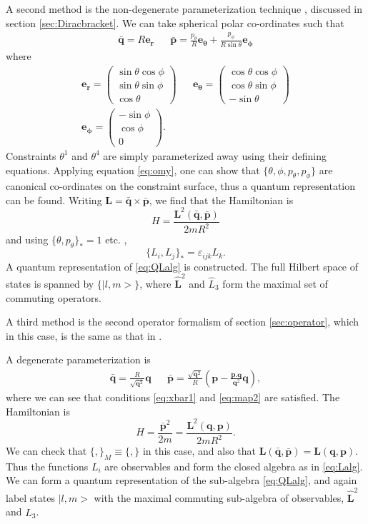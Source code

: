\documentclass[a4paper,12pt]{article}
\theoremstyle{definition}
\theoremstyle{remark}
\numberwithin{equation}{section}
\newcommand{\eps}{\varepsilon}
\newcommand{\Lh}{\hat{L}}
\newcommand{\erb}{\mathbf{e_r}}
\newcommand{\etb}{\mathbf{e_{\theta}}}
\newcommand{\epb}{\mathbf{e_{\phi}}}
\newcommand{\qb}{\mathbf{q}}
\newcommand{\pb}{\mathbf{p}}
\newcommand{\Lb}{\mathbf{L}}
\newcommand{\Lhb}{\mathbf{\hat{L}}}
\begin{document}
{A second method is the non-degenerate parameterization technique
, discussed in section \ref{sec:Diracbracket}.
We can take spherical polar co-ordinates such that
\begin{eqnarray}
\bar{\qb}=R\erb && \bar{\pb}=\frac{p_{\theta}}{R}\etb +
\frac{p_{\phi}}{R\sin{\theta}}\epb
\end{eqnarray}
where
\begin{eqnarray}
\erb=
\begin{pmatrix}
\sin{\theta}\cos{\phi}\\
\sin{\theta}\sin{\phi}\\
\cos{\theta}
\end{pmatrix}&&
\etb=
\begin{pmatrix}
\cos{\theta}\cos{\phi}\\
\cos{\theta}\sin{\phi}\\
-\sin{\theta}
\end{pmatrix}\\
\epb=
\begin{pmatrix}
-\sin{\phi}\\
\cos{\phi}\\
0
\end{pmatrix}.
\end{eqnarray}
Constraints $\theta^1$ and $\theta^4$ are simply parameterized away
using their defining equations. Applying equation \eqref{eq:omy},
one can show that $\{\theta,\phi,p_{\theta},p_{\phi}\}$ are
canonical co-ordinates on the constraint surface, thus a quantum
representation can be found. Writing
$\Lb=\bar{\qb}\times\bar{\pb}$, we find that the Hamiltonian is
\begin{equation}
H=\frac{\Lb^2(\bar{\qb},\bar{\pb})}{2mR^2}
\end{equation}
and using $\{\theta, p_{\theta}\}_*=1$ etc. ,
\begin{equation}
\{L_i,L_j\}_*=\eps_{ijk}L_k.
\end{equation}
A quantum representation of \eqref{eq:QLalg} is constructed.
The full Hilbert space of states is spanned by $\{|l,m>\}$, where
$\Lhb^2$ and $\Lh_3$ form the maximal set of commuting operators.

A third method is the second operator formalism of section
\ref{sec:operator}, which in this case, is the same as that in
\cite{Lyakhovich:2001cm}.

A degenerate parameterization is
\begin{eqnarray}
\bar{\qb}=\frac{R}{\sqrt{\qb^2}}\qb &&
\bar{\pb}=\frac{\sqrt{\qb^2}}{R}(\pb-\frac{\pb.\qb}{\qb^2}\qb),
\end{eqnarray}
where we can see that conditions \eqref{eq:xbar1} and
\eqref{eq:map2} are satisfied.
The Hamiltonian is
\begin{equation}
H=\frac{\bar{\pb}^2}{2m}= \frac{\Lb^2(\qb,\pb)}{2mR^2}.
\end{equation}
We can check that $\{,\}_M \equiv \{,\}$ in this case, and also
that $\Lb(\bar{\qb},\bar{\pb})=\Lb(\qb,\pb)$. Thus the functions
$L_i$ are observables and form the closed algebra as in
\eqref{eq:Lalg}. We can form a quantum representation of the
sub-algebra \eqref{eq:QLalg}, and again label states $|l,m>$ with
the maximal commuting sub-algebra of observables, $\Lhb^2$ and
$\Lh_3$.

}
\end{document}
